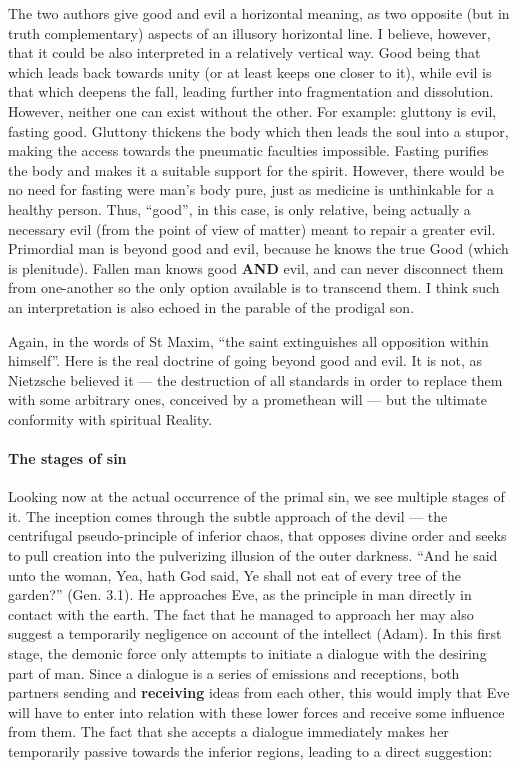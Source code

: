 The two authors give good and evil a horizontal meaning, as two opposite (but in truth complementary) aspects of an illusory horizontal line. I believe, however, that it could be also interpreted in a relatively vertical way. Good being that which leads back towards unity (or at least keeps one closer to it), while evil is that which deepens the fall, leading further into fragmentation and dissolution. However, neither one can exist without the other. For example: gluttony is evil, fasting good. Gluttony thickens the body which then leads the soul into a stupor, making the access towards the pneumatic faculties impossible. Fasting purifies the body and makes it a suitable support for the spirit. However, there would be no need for fasting were man's body pure, just as medicine is unthinkable for a healthy person. Thus, ``good'', in this case, is only relative, being actually a necessary evil (from the point of view of matter) meant to repair a greater evil. Primordial man is beyond good and evil, because he knows the true Good (which is plenitude). Fallen man knows good \textbf{AND} evil, and can never disconnect them from one-another so the only option available is to transcend them. I think such an interpretation is also echoed in the parable of the prodigal son.

Again, in the words of St Maxim, ``the saint extinguishes all opposition within himself''. Here is the real doctrine of going beyond good and evil. It is not, as Nietzsche believed it --- the destruction of all standards in order to replace them with some arbitrary ones, conceived by a promethean will --- but the ultimate conformity with spiritual Reality.

\paragraph{The stages of sin}


Looking now at the actual occurrence of the primal sin, we see multiple stages of it. The inception comes through the subtle approach of the devil --- the centrifugal pseudo-principle of inferior chaos, that opposes divine order and seeks to pull creation into the pulverizing illusion of the outer darkness. ``And he said unto the woman, Yea, hath God said, Ye shall not eat of every tree of the garden?'' (Gen. 3.1). He approaches Eve, as the principle in man directly in contact with the earth. The fact that he managed to approach her may also suggest a temporarily negligence on account of the intellect (Adam). In this first stage, the demonic force only attempts to initiate a dialogue with the desiring part of man. Since a dialogue is a series of emissions and receptions, both partners sending and \textbf{receiving} ideas from each other, this would imply that Eve will have to enter into relation with these lower forces and receive some influence from them. The fact that she accepts a dialogue immediately makes her temporarily passive towards the inferior regions, leading to a direct suggestion:

